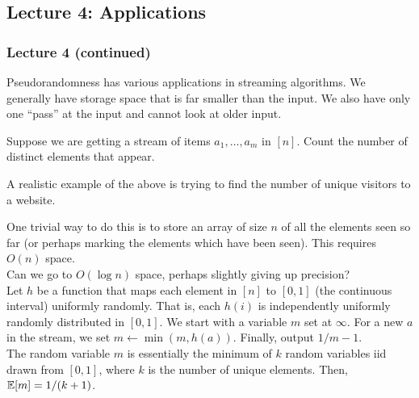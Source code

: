 	\subsection{Lecture 4: Applications}

		\subsubsection{Lecture 4 (continued)}

			Pseudorandomness has various applications in streaming algorithms. We generally have storage space that is far smaller than the input. We also have only one ``pass'' at the input and cannot look at older input.

			\begin{problem*}
				Suppose we are getting a stream of items $a_1,\ldots,a_m$ in $[n]$. Count the number of distinct elements that appear.
			\end{problem*}
			A realistic example of the above is trying to find the number of unique visitors to a website.

			One trivial way to do this is to store an array of size $n$ of all the elements seen so far (or perhaps marking the elements which have been seen). This requires $O(n)$ space.\\
			Can we go to $O(\log n)$ space, perhaps slightly giving up precision?\\

			Let $h$ be a function that maps each element in $[n]$ to $[0,1]$ (the continuous interval) uniformly randomly. That is, each $h(i)$ is independently uniformly randomly distributed in $[0,1]$. We start with a variable $m$ set at $\infty$. For a new $a$ in the stream, we set $m \gets \min(m,h(a))$. Finally, output $1/m - 1$.\\
			The random variable $m$ is essentially the minimum of $k$ random variables iid drawn from $[0,1]$, where $k$ is the number of unique elements. Then, $\mathbb{E}[m] = 1/(k+1)$.


			